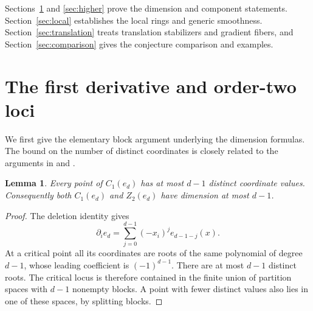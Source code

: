 \documentclass[11pt]{article}
\newtheorem{lemma}[theorem]{Lemma}
\theoremstyle{remark}
\begin{document}
Sections~\ref{sec:first} and \ref{sec:higher} prove the dimension
and component statements. Section~\ref{sec:local} establishes the
local rings and generic smoothness. Section~\ref{sec:translation}
treats translation stabilizers and gradient fibers, and
Section~\ref{sec:comparison} gives the conjecture comparison and examples.

\section{The first derivative and order-two loci}\label{sec:first}

We first give the elementary block argument underlying the dimension
formulas. The bound on the number of distinct coordinates is closely
related to the arguments in \cite[Theorem~3.1]{CMP} and
\cite[Lemma~2.4]{Orzel}.

\begin{lemma}\label{lem:roots}
Every point of $C_1(e_d)$ has at most $d-1$ distinct coordinate values.
Consequently both $C_1(e_d)$ and $Z_2(e_d)$ have dimension at most
$d-1$.
\end{lemma}
\begin{proof}
The deletion identity gives
\[
 \partial_i e_d=\sum_{j=0}^{d-1}(-x_i)^j e_{d-1-j}(x).
\]
At a critical point all its coordinates are roots of the same
polynomial of degree $d-1$, whose leading coefficient is
$(-1)^{d-1}$. There are at most $d-1$ distinct roots. The critical
locus is therefore contained in the finite union of partition
spaces with $d-1$ nonempty blocks. A point with fewer distinct
values also lies in one of these spaces, by splitting blocks.
\end{proof}
\end{document}
